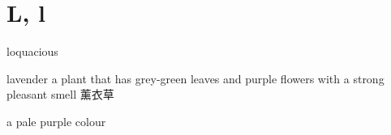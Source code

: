 \section{L, l}

\begin{word}{loquacious}
\end{word}

\begin{word}{lavender}
    a plant that has grey-green leaves and purple flowers with a strong pleasant smell 薰衣草

    a pale purple colour
\end{word}